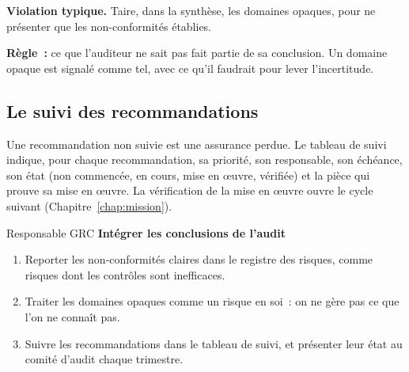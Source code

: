 \begin{boxalert}
\textbf{Violation typique.} Taire, dans la synthèse, les domaines opaques,
pour ne présenter que les non-conformités établies.

\smallskip
\textbf{Règle~:} ce que l'auditeur ne sait pas fait partie de sa conclusion.
Un domaine opaque est signalé comme tel, avec ce qu'il faudrait pour lever
l'incertitude.
\end{boxalert}

\subsection{Le suivi des recommandations}

Une recommandation non suivie est une assurance perdue. Le tableau de suivi
indique, pour chaque recommandation, sa priorité, son responsable, son
échéance, son état (non commencée, en cours, mise en œuvre, vérifiée) et la
pièce qui prouve sa mise en œuvre. La vérification de la mise en œuvre
ouvre le cycle suivant (Chapitre~\ref{chap:mission}).

\begin{boxmetier}{Responsable GRC}
\textbf{Intégrer les conclusions de l'audit}
\begin{enumerate}
    \item Reporter les non-conformités claires dans le registre des risques,
          comme risques dont les contrôles sont inefficaces.
    \item Traiter les domaines opaques comme un risque en soi~: on ne gère
          pas ce que l'on ne connaît pas.
    \item Suivre les recommandations dans le tableau de suivi, et présenter
          leur état au comité d'audit chaque trimestre.
\end{enumerate}
\end{boxmetier}

\separateur

